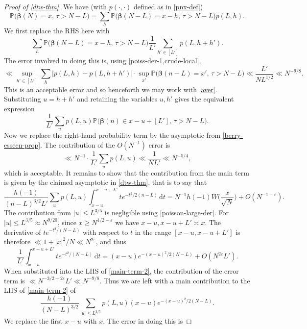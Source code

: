 \documentclass[11pt,reqno]{amsart}
\numberwithin{equation}{section}
\theoremstyle{definition}
\theoremstyle{remark}
\newcommand{\mb}{\mathbb}
\newcommand{\eps}{\varepsilon}
\def\boldbeta{\boldsymbol\beta}
\renewcommand{\le}{\leqslant}
\renewcommand{\ge}{\geqslant}
\begin{document}
\begin{proof}[Proof of \cref{dtw-thm}]
We have (with $p(\cdot, \cdot)$ defined as in \cref{pnx-def})
\[ \mb{P}\big(\boldbeta(N) = x, \, \tau > N - L) = \sum_h \mb{P}\big(\boldbeta(N - L) = x - h,\, \tau > N - L\big) p(L,h) . \] 
We first replace the RHS here with 
\begin{equation}\label{aver} \sum_h \mb{P}\big(\boldbeta(N - L) = x - h,\, \tau > N - L\big) \frac{1}{L'} \sum_{h' \in [L']} p(L,h + h') .\end{equation} The error involved in doing this is, using \cref{poiss-der-1,crude-local},
\[ \ll \sup_{h' \in [L']}\sum_{h} | p(L, h) - p(L, h + h')| \cdot  \sup_{x'} \mb{P} \big(\boldbeta(n - L) = x',\, \tau > N - L\big) \ll \frac{L'}{NL^{1/2}} \ll N^{-9/8}.\]
This is an acceptable error and so henceforth we may work with \cref{aver}. Substituting $u = h + h'$ and retaining the variables $u,h'$ gives the equivalent expression
\[ \frac{1}{L'} \sum_u p(L,u) \mb{P}\big( \boldbeta(n) \in x - u + [L'], \,\tau > N - L\big).\]
Now we replace the right-hand probability term by the asymptotic from \cref{berry-esseen-prop}. The contribution of the $O(N^{-1})$ error is
\[ \ll N^{-1} \cdot \frac{1}{L'} \sum_u p(L,u) \ll \frac{1}{N L'} \ll N^{-5/4}, \] which is acceptable. It remains to show that the contribution from the main term is given by the claimed asymptotic in \cref{dtw-thm}, that is to say that 
\begin{equation}\label{main-term-2} \frac{h(-1)}{(n - L)^{3/2} L'} \sum_u p(L, u) \int^{x - u + L'}_{x - u} t e^{-t^2/2(n - L)} \,\mathrm{d}t = N^{-1}h(-1) W\big(\frac{x}{\sqrt{N}}\big) + O(N^{-1 - \eps}).\end{equation} 
The contribution from $|u| \le L^{3/5}$ is negligible using \cref{poisson-large-der}. For $|u| \le L^{3/5} \approx N^{9/20}$, since $x \ge N^{1/2 - \eps}$ we have $x - u, x - u + L' \asymp x$. The derivative of $t e^{-t^2/(N - L)}$ with respect to $t$ in the range $[x - u, x - u + L']$ is therefore $\ll 1 + |x|^2/N \ll N^{2\eps}$, and thus
\[  \frac{1}{L'} \int^{x - u + L'}_{x - u} t e^{-t^2/(N - L)} \,\mathrm{d}t =  (x - u) e^{-(x - u)^2/2(N - L)}  + O(N^{2\eps} L').  \]
When substituted into the LHS of \cref{main-term-2}, the contribution of the error term is $\ll N^{-3/2 + 2\eps} L' \ll N^{-9/8}$. Thus we are left with a main contribution to the LHS of \cref{main-term-2} of
\begin{equation}\label{main-term-3} \frac{h(-1)}{(N - L)^{3/2}} \sum_{|u| \le L^{3/5}} p(L, u)  (x - u) e^{-(x - u)^2/2(N - L)}.\end{equation} 
We replace the first $x - u$ with $x$. The error in doing this is

\end{proof}
\end{document}
